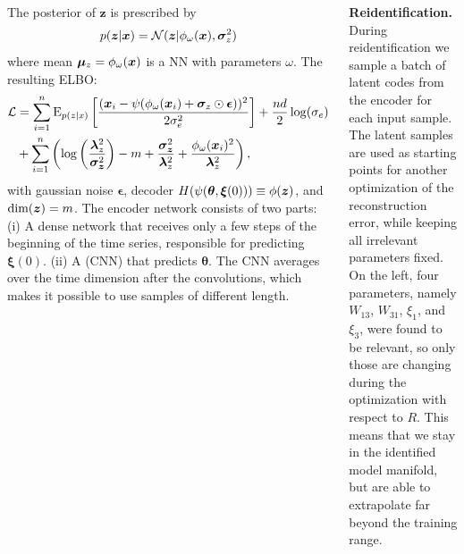 \documentclass[25pt]{tikzposter}
\begin{document}
\begin{columns}
{    The posterior of $\bm z$ is prescribed by
    \begin{align}
      \label{eq:ard_posterior}
      p(\bm{z}|\bm{x}) = \mathcal{N}(\bm{z}|\phi_\omega(\bm{x}), \bm{\sigma}_z^2)
    \end{align}
    where mean $\bm{\mu}_{z}=\phi_\omega(\bm{x})$ is a NN with parameters
    $\omega$.
    The resulting ELBO:
    {\fontsize{25}{20}
    \begin{equation}
    \begin{aligned}
      \label{eq:elbo_reparam}
      \mathcal{L} &= \sum_{i=1}^n \text{E}_{p(z|x)}\left[\frac{(\bm{x}_i - \psi(\phi_\omega(\bm{x}_i) + \bm{\sigma}_z \odot \bm{\epsilon}))^2}{2\sigma_e^2}\right]
                  + \frac{nd}{2}\log(\sigma_e) \\
                  &+ \sum_{i=1}^n \left(
                      \log\left(\frac{\bm{\lambda}_z^2}{\bm{\sigma_z}^2}\right)
                      -m + \frac{\bm{\sigma_z}^2}{\bm{\lambda}_z^2} + \frac{\phi_\omega(\bm{x}_i)^2}{\bm{\lambda}_z^2}
                  \right),
    \end{aligned}
    \end{equation}}
    \hspace{-.6cm}with gaussian noise $\bm{\epsilon}$, decoder
    $H(\psi(\bm\theta,\bm\xi(0)))\equiv\phi(\bm{z})$, and $\text{dim}(\bm{z}) = m$.
    The encoder network consists of two parts: (i) A dense network that receives
    only a few steps of the beginning of the time series, responsible for
    predicting $\bm \xi(0)$. (ii) A (CNN) that
    predicts $\bm \theta$.  The CNN averages over the time
    dimension after the convolutions, which makes it possible to use samples of
    different length.

    \textbf{Reidentification.} During reidentification we sample a batch of
    latent codes from the encoder for each input sample.  The latent samples
    are used as starting points for another optimization of the reconstruction
    error, while keeping all irrelevant parameters fixed.
    On the left, four parameters, namely $W_{13}$,
    $W_{31}$, $\xi_{1}$, and $\xi_{3}$, were found to be relevant, so only
    those are changing during the optimization with respect to $R$.
    This means that we stay in the identified model manifold, but are able to
    extrapolate far beyond the training range.   
    \vspace{0.1cm}
  }
  
\end{columns}
\end{document}
